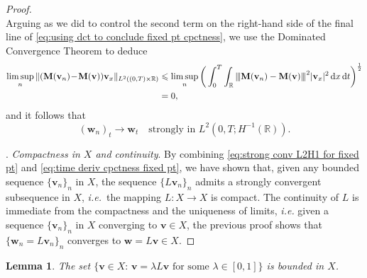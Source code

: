 \documentclass[11pt,a4paper,reqno]{amsart}
\numberwithin{equation}{section}
\newtheorem{lemma}{Lemma}[section]
\theoremstyle{definition}
\theoremstyle{remark}
\newcommand{\vertiii}[1]{{\left\vert\kern-0.25ex\left\vert\kern-0.25ex\left\vert #1 
    \right\vert\kern-0.25ex\right\vert\kern-0.25ex\right\vert}}
\newcommand{\bv}{\mathbf{v}}
\newcommand{\bw}{\mathbf{w}}
\renewcommand{\d}{\, \mathrm{d}}
\newcommand{\bM}{\mathbf{M}}
\renewcommand{\leq}{\leqslant}
\begin{document}
{\begin{proof}
\begin{equation*}
\end{equation*}
Arguing as we did to control the second term on the right-hand side of the final line of \eqref{eq:using dct to conclude fixed pt cpctness}, we use the Dominated Convergence Theorem to deduce
\begin{align*}
    \limsup_n \Vert (\bM(\bv_n)\! -\! \bM(\bv) ) \bv_x\Vert_{L^2((0,T)\times\mathbb{R})} 
    &\leq \limsup_n \bigg(\int_0^T \int_\mathbb{R} \vertiii{\bM(\bv_n) - \bM(\bv)}^2 |\bv_x|^2 \d x \d t \bigg)^{\frac{1}{2}} \\ 
    &= 0, 
\end{align*}
and it follows that 
\begin{equation}\label{eq:time deriv cpctness fixed pt}
    (\bw_n)_t \to \bw_t  \quad \text{strongly in } L^2(0,T;H^{-1}(\mathbb{R})). 
\end{equation}

\smallskip 
{}. \textit{Compactness in $X$ and continuity}. By combining \eqref{eq:strong conv L2H1 for fixed pt} and \eqref{eq:time deriv cpctness fixed pt}, we have shown that, given any bounded sequence $\{\bv_n\}_n$ in $X$, the sequence $\{L\bv_n \}_n$ admits a strongly convergent subsequence in $X$, \textit{i.e.}~the mapping $L:X \to X$ is compact. The continuity of $L$ is immediate from the compactness and the uniqueness of limits, \textit{i.e.} given a sequence $\{\bv_n \}_n$ in $X$ converging to $\bv \in X$, the previous proof shows that $\{\bw_n=L\bv_n\}_n$ converges to $\bw=L\bv \in X$. 
\end{proof}




\begin{lemma}\label{lem:fixed pt ii}
    The set $\big\{ \bv \in X : \, \bv = \lambda L\bv \text{ for some } \lambda \in [0,1] \big\}$ is bounded in $X$. 
\end{lemma}



}
\end{document}
